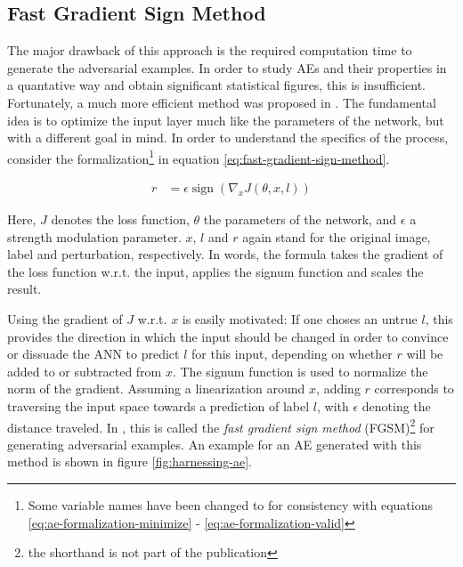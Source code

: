 \documentclass[11pt, a4paper]{article}
\newcommand\braces[1]{\left(#1\right)}
\DeclareMathOperator{\sign}{sign}
\begin{document}
\subsection{Fast Gradient Sign Method}
\label{sec:fast-gradient-sign-method}
The major drawback of this approach is the required computation time to generate the adversarial examples. In order to study AEs and their properties in a quantative way and obtain significant statistical figures, this is insufficient. Fortunately, a much more efficient method was proposed in \cite{explaining-and-harnessing-adversarial-examples}. The fundamental idea is to optimize the input layer much like the parameters of the network, but with a different goal in mind. In order to understand the specifics of the process, consider the formalization\footnote{Some variable names have been changed to for consistency with equations \eqref{eq:ae-formalization-minimize} - \eqref{eq:ae-formalization-valid}} in equation \eqref{eq:fast-gradient-sign-method}.

\begin{align}
	r &= \epsilon \sign \braces{\nabla_x J\braces{\theta, x, l}} \label{eq:fast-gradient-sign-method}
\end{align}

Here, $J$ denotes the loss function, $\theta$ the parameters of the network, and $\epsilon$ a strength modulation parameter. $x$, $l$ and $r$ again stand for the original image, label and perturbation, respectively. In words, the formula takes the gradient of the loss function w.r.t. the input, applies the signum function and scales the result.

Using the gradient of $J$ w.r.t. $x$ is easily motivated: If one choses an untrue $l$, this provides the direction in which the input should be changed in order to convince or dissuade the ANN to predict $l$ for this input, depending on whether $r$ will be added to or subtracted from $x$. The signum function is used to normalize the norm of the gradient. Assuming a linearization around $x$, adding $r$ corresponds to traversing the input space towards a prediction of label $l$, with $\epsilon$ denoting the distance traveled. In \cite{explaining-and-harnessing-adversarial-examples}, this is called the \emph{fast gradient sign method} (FGSM)\footnote{the shorthand is not part of the publication} for generating adversarial examples. An example for an AE generated with this method is shown in figure \ref{fig:harnessing-ae}.
\end{document}
